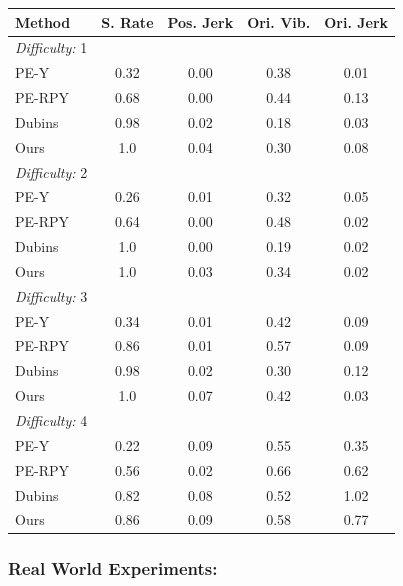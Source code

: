 \documentclass[Afour,sageh,times]{sagej}
\theoremstyle{lemma}
\begin{document}
\begin{table}
    \centering
    \small
    \begin{tabular}{lcccc} 
    \toprule
    \textbf{Method} & \textbf{S. Rate} & \textbf{Pos. Jerk}  & \textbf{Ori. Vib.} & \textbf{Ori. Jerk} \\ 
\toprule \textit{Difficulty:} 1 \\ \hdashline 
PE-Y & 0.32 & 0.00 & 0.38 & 0.01 \\ 
PE-RPY & 0.68 & 0.00 & 0.44 & 0.13 \\
Dubins & 0.98 & 0.02 & 0.18 & 0.03 \\
\rowcolor{lightgray}   Ours & 1.0 & 0.04 & 0.30 & 0.08 \\ 
\toprule \textit{Difficulty:} 2 \\ \hdashline 
PE-Y & 0.26 & 0.01 & 0.32 & 0.05 \\ 
PE-RPY & 0.64 & 0.00 & 0.48 & 0.02 \\ 
Dubins & 1.0 & 0.00 & 0.19 & 0.02 \\ 
\rowcolor{lightgray}   Ours & 1.0 & 0.03 & 0.34 & 0.02 \\ 
\toprule \textit{Difficulty:} 3 \\ \hdashline 
PE-Y & 0.34 & 0.01 & 0.42 & 0.09 \\ 
PE-RPY & 0.86 & 0.01 & 0.57 & 0.09 \\ 
Dubins & 0.98 & 0.02 & 0.30 & 0.12 \\
\rowcolor{lightgray}   Ours & 1.0 & 0.07 & 0.42 & 0.03 \\ 
\toprule \textit{Difficulty:} 4 \\ \hdashline 
PE-Y & 0.22 & 0.09 & 0.55 & 0.35 \\ 
PE-RPY & 0.56 & 0.02 & 0.66 & 0.62 \\ 
Dubins & 0.82 & 0.08 & 0.52 & 1.02 \\
\rowcolor{lightgray}   Ours & 0.86 & 0.09 & 0.58 & 0.77 \\ 
    \bottomrule
    \end{tabular}
    \label{tab:simulation-results}
\end{table}

\subsubsection{Real World Experiments:} 
\end{document}
